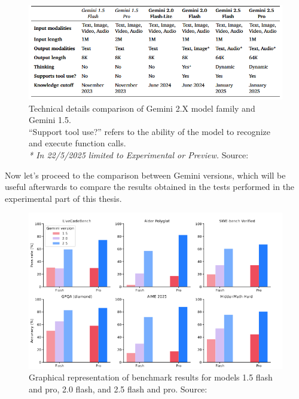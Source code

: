 \documentclass[12pt]{article}
\begin{document}
    \begin{figure}[H]
    \centering
            \includegraphics[width=1\textwidth]{GeminiGenerations.png}
    \caption[Technical details of the Gemini 2.X model family]{Technical details comparison of Gemini 2.X model family and Gemini 1.5. \\
    ``Support tool use?'' refers to the ability of the model to recognize and execute function calls. \\ 
    \textit{* In 22/5/2025 limited to Experimental or Preview.} Source: \cite{comanici2025gemini25pushingfrontier}}
    \end{figure}  
    
Now let's proceed to the comparison between Gemini versions, which will be useful afterwards to compare the results obtained in the tests performed in the experimental part of this thesis.\\
    
	\begin{figure}[H]
    \centering
            \includegraphics[width=1\textwidth]{GeminiBenchmarks.png}
    \caption[Graphical representation of Gemini benchmarks]{Graphical representation of benchmark results for models 1.5 flash and pro, 2.0 flash, and 2.5 flash and pro. Source: \cite{comanici2025gemini25pushingfrontier}}
    \end{figure}     
    
\end{document}
